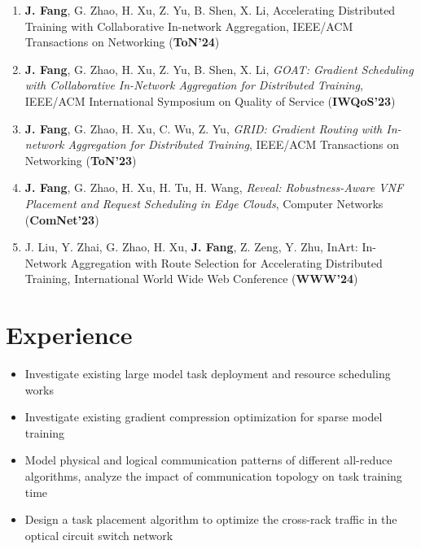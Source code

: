 \documentclass{resume}
\begin{document}
\begin{enumerate}
  \item \textbf{J. Fang}, G. Zhao, H. Xu, Z. Yu, B. Shen, X. Li, Accelerating Distributed Training with Collaborative
  In-network Aggregation, IEEE/ACM Transactions on Networking (\textbf{ToN'24})
  \item \textbf{J. Fang}, G. Zhao, H. Xu, Z. Yu, B. Shen, X. Li, \textit{GOAT: Gradient Scheduling with Collaborative In-Network Aggregation for Distributed Training}, IEEE/ACM International Symposium on Quality of Service (\textbf{IWQoS'23})
  \item \textbf{J. Fang}, G. Zhao, H. Xu, C. Wu, Z. Yu, \textit{GRID: Gradient Routing with In-network Aggregation for Distributed Training}, IEEE/ACM Transactions on Networking (\textbf{ToN'23})
  \item \textbf{J. Fang}, G. Zhao, H. Xu, H. Tu, H. Wang, \textit{Reveal: Robustness-Aware VNF Placement and Request Scheduling in Edge Clouds}, Computer Networks (\textbf{ComNet'23})
  \item J. Liu, Y. Zhai, G. Zhao, H. Xu, \textbf{J. Fang}, Z. Zeng, Y. Zhu, InArt: In-Network Aggregation with Route
  Selection for Accelerating Distributed Training, International World Wide Web Conference (\textbf{WWW'24})
\end{enumerate}

\section{Experience}

\begin{itemize}
  \item Investigate existing large model task deployment and resource scheduling works
  \item Investigate existing gradient compression optimization for sparse model training
  \item Model physical and logical communication patterns of different all-reduce algorithms, analyze the impact of communication topology on task training time
  \item Design a task placement algorithm to optimize the cross-rack traffic in the optical circuit switch network
\end{itemize}
\end{document}
